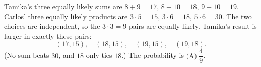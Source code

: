 Tamika's three equally likely sums are $8+9=17$, $8+10=18$, $9+10=19$. Carlos' three equally likely products are $3\cdot5=15$, $3\cdot6=18$, $5\cdot6=30$. The two choices are independent, so the $3\cdot3=9$ pairs are equally likely. Tamika's result is larger in exactly these pairs:
\[
(17,15),\quad(18,15),\quad(19,15),\quad(19,18).
\]
(No sum beats $30$, and $18$ only ties $18$.) The probability is $\boxed{\text{(A)}\ \dfrac{4}{9}}$.
